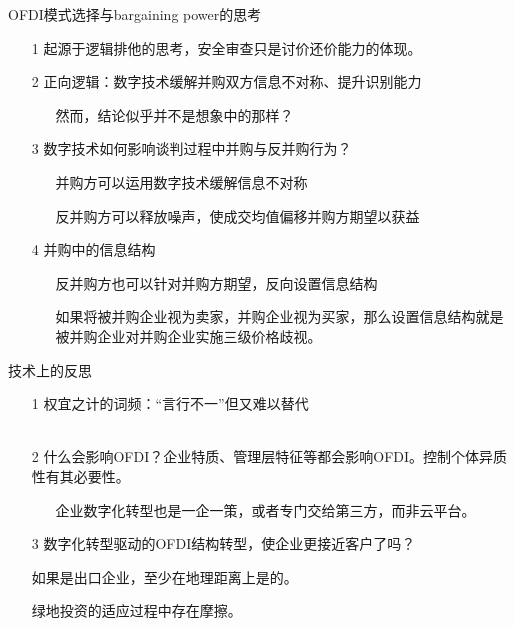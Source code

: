 \documentclass{beamer}
\begin{document}
\begin{frame}{OFDI模式选择与bargaining power的思考}
	
	\begin{itemize}
		\item[1] 起源于逻辑排他的思考，安全审查只是讨价还价能力的体现。
		\item[2] 正向逻辑：数字技术缓解并购双方信息不对称、提升识别能力
		\begin{itemize}
			\item[] 然而，结论似乎并不是想象中的那样？
		\end{itemize}
		\item[3] 数字技术如何影响谈判过程中并购与反并购行为？
		\begin{itemize}
			\item[] 并购方可以运用数字技术缓解信息不对称
			\item[] 反并购方可以释放噪声，使成交均值偏移并购方期望以获益
		\end{itemize}
		\item[4] 并购中的信息结构
		\begin{itemize}
			\item[] 反并购方也可以针对并购方期望，反向设置信息结构
			\item[] 如果将被并购企业视为卖家，并购企业视为买家，那么设置信息结构就是被并购企业对并购企业实施三级价格歧视。
		\end{itemize}
	\end{itemize}

\end{frame}
\begin{frame}{技术上的反思}
	\begin{itemize}
		\item[1] 权宜之计的词频：“言行不一”但又难以替代\\~\\
		\item[2] 什么会影响OFDI？企业特质、管理层特征等都会影响OFDI。控制个体异质性有其必要性。\\
		\begin{itemize}
			\item[] 企业数字化转型也是一企一策，或者专门交给第三方，而非云平台。
		\end{itemize}
		\item[3] 数字化转型驱动的OFDI结构转型，使企业更接近客户了吗？
			\item[] 如果是出口企业，至少在地理距离上是的。
			\item[] 绿地投资的适应过程中存在摩擦。
	\end{itemize}
\end{frame}
\end{document}
